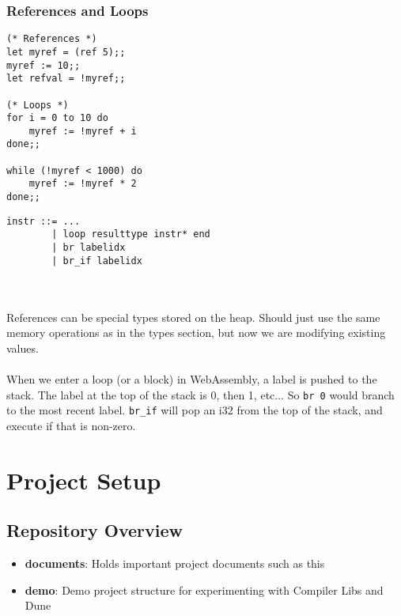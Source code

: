 \documentclass{report}
\newcommand{\textinline}{\texttt}
\begin{document}
\subsection{References and Loops}
\begin{minipage}{0.4\linewidth}
\begin{verbatim}
(* References *)
let myref = (ref 5);;
myref := 10;;
let refval = !myref;;

(* Loops *)
for i = 0 to 10 do
    myref := !myref + i
done;;

while (!myref < 1000) do
    myref := !myref * 2
done;;
\end{verbatim}
\end{minipage}  
\begin{minipage}{0.6\linewidth}
\begin{verbatim}
instr ::= ...
        | loop resulttype instr* end
        | br labelidx
        | br_if labelidx
\end{verbatim}
\end{minipage}
\\\\
References can be special types stored on the heap. Should just use the same memory operations as in the types section, but now we are modifying existing values.
\\\\
When we enter a loop (or a block) in WebAssembly, a label is pushed to the stack. The label at the top of the stack is 0, then 1, etc... So \textinline{br 0} would branch to the most recent label. \textinline{br_if} will pop an i32 from the top of the stack, and execute if that is non-zero.


\chapter{Project Setup}

\section{Repository Overview}
\begin{itemize}
	\item \textbf{documents}: Holds important project documents such as this
	\item \textbf{demo}: Demo project structure for experimenting with Compiler Libs and Dune
\end{itemize}
\end{document}
